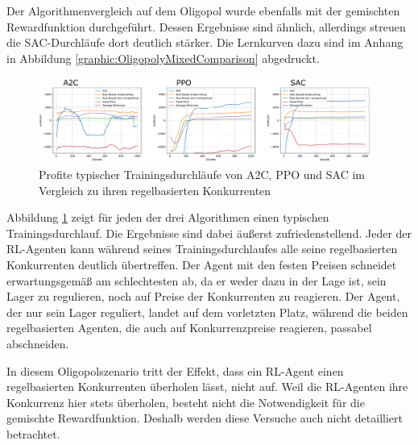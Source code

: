 Der Algorithmenvergleich auf dem Oligopol wurde ebenfalls mit der gemischten Rewardfunktion durchgeführt.
Dessen Ergebnisse sind ähnlich, allerdings streuen die SAC-Durchläufe dort deutlich stärker.
Die Lernkurven dazu sind im Anhang in Abbildung \ref{graphic:OligopolyMixedComparison} abgedruckt.

\begin{figure}[htb]
	\centering
	\includegraphics[width=\textwidth]{main/oligopoly_vendor_comparison.pdf}
	\caption{Profite typischer Trainingsdurchläufe von A2C, PPO und SAC im Vergleich zu ihren regelbasierten Konkurrenten}
	\label{graphic:OligopolyVendorComparison}
\end{figure}

Abbildung \ref{graphic:OligopolyVendorComparison} zeigt für jeden der drei Algorithmen einen typischen Trainingsdurchlauf.
Die Ergebnisse sind dabei äußerst zufriedenstellend.
Jeder der RL-Agenten kann während seines Trainingsdurchlaufes alle seine regelbasierten Konkurrenten deutlich übertreffen.
Der Agent mit den festen Preisen schneidet erwartungsgemäß am schlechtesten ab, da er weder dazu in der Lage ist, sein Lager zu regulieren, noch auf Preise der Konkurrenten zu reagieren.
Der Agent, der nur sein Lager reguliert, landet auf dem vorletzten Platz, während die beiden regelbasierten Agenten, die auch auf Konkurrenzpreise reagieren, passabel abschneiden.

In diesem Oligopolszenario tritt der Effekt, dass ein RL-Agent einen regelbasierten Konkurrenten überholen lässt, nicht auf.
Weil die RL-Agenten ihre Konkurrenz hier stets überholen, besteht nicht die Notwendigkeit für die gemischte Rewardfunktion.
Deshalb werden diese Versuche auch nicht detailliert betrachtet.